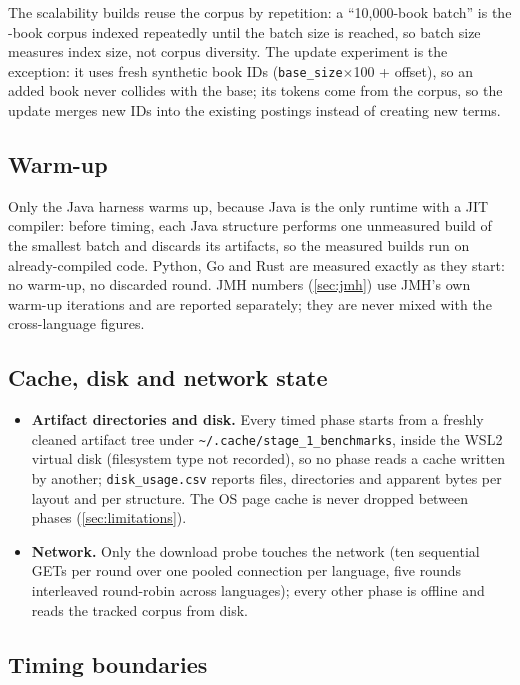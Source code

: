 The scalability builds reuse the corpus by repetition: a ``10{,}000-book
batch'' is the -book corpus indexed repeatedly until the batch
size is reached, so batch size measures index size, not corpus diversity.
The update experiment is the exception: it uses fresh synthetic book IDs
(\texttt{base\_size}$\times$100 + offset), so an added book never collides
with the base; its tokens come from the corpus, so the update merges new IDs
into the existing postings instead of creating new terms.

\subsection{Warm-up}
\label{sec:warmup}

Only the Java harness warms up, because Java is the only runtime with a JIT
compiler: before timing, each Java structure performs one unmeasured build of
the smallest batch and discards its artifacts, so the measured builds run on
already-compiled code. Python, Go and Rust are measured exactly as they
start: no warm-up, no discarded round. JMH numbers
(\cref{sec:jmh}) use JMH's own warm-up iterations and are reported
separately; they are never mixed with the cross-language figures.

\subsection{Cache, disk and network state}
\label{sec:environment-state}

\begin{itemize}
    \item \textbf{Artifact directories and disk.} Every timed phase starts
    from a freshly cleaned artifact tree under
    \texttt{\textasciitilde/.cache/\allowbreak stage\_1\_benchmarks}, inside
    the WSL2 virtual disk (filesystem type not recorded), so no phase reads a
    cache written by another; \texttt{disk\_usage.csv} reports files,
    directories and apparent bytes per layout and per structure. The OS page
    cache is never dropped between phases (\cref{sec:limitations}).
    \item \textbf{Network.} Only the download probe touches the network (ten
    sequential GETs per round over one pooled connection per language, five
    rounds interleaved round-robin across languages); every other phase is
    offline and reads the tracked corpus from disk.
\end{itemize}

\subsection{Timing boundaries}
\label{sec:timing-boundaries}

